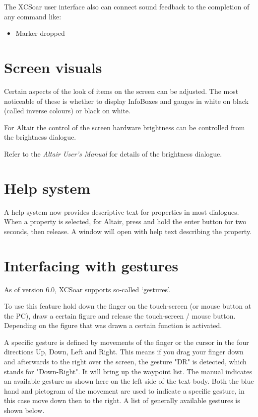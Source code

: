 The XCSoar user interface also can connect sound feedback to the completion
of any command like:
\begin{itemize}
\item Marker dropped
\end{itemize}


\section{Screen visuals}

Certain aspects of the look of items on the screen can be adjusted.
The most noticeable of these is whether to display InfoBoxes and
gauges in white on black (called inverse colours) or black on white.

For Altair the control of the screen hardware
brightness can be controlled from the brightness dialogue.
\begin{quote}
\blink{}
\end{quote}

Refer to the {\em Altair User's Manual} for details of the brightness
dialogue.


\section{Help system}

A help system now provides descriptive text for properties in
most dialogues.  When a property is selected, for Altair, press and hold the
enter button for two seconds, then release.  A window will open with
help text describing the property.

\section{Interfacing with gestures}\label{sec:gestures}
As of version 6.0, XCSoar supports so-called `gestures'.

To use this feature hold down the finger on the
touch-screen (or mouse button at the PC), draw a certain figure and release
the touch-screen / mouse button. Depending on the figure that was drawn
a certain function is activated. 

A specific gesture is defined by movements of the finger or the
cursor in the four directions Up, Down, Left and Right. This means if
you drag your finger down and afterwards to the right over the screen,
 the gesture "DR" is detected, which stands for "Down-Right".
It will bring up the waypoint list. The manual indicates an available
gesture as shown here on the left side of the text body. Both the blue hand
and pictogram of the movement are used to indicate a specific gesture, in this
case move down then to the right. A list of generally available gestures is
shown below. 
\vspace{2em}

